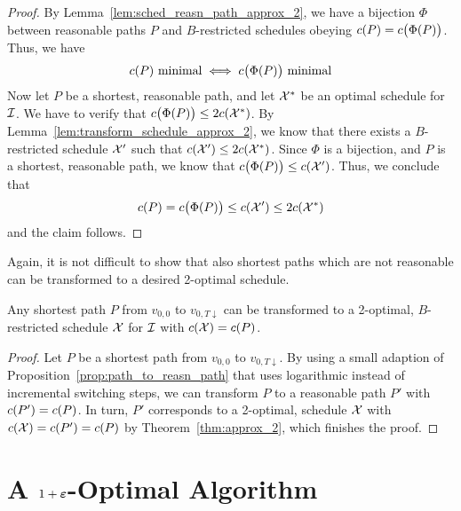 \begin{proof}
By Lemma~\ref{lem:sched_reasn_path_approx_2}, we have a bijection $\Phi$ between reasonable paths $P$ and $B$-restricted schedules obeying $c(P)=c\bigl(\Phi(P)\bigr)$. Thus, we have 
\begin{equation*}
	c(P)\text{ minimal}\iff c\bigl(\Phi(P)\big)\text{ minimal}
\end{equation*}
Now let $P$ be a shortest, reasonable path, and let $\mathcal{X}^*$ be an optimal schedule for $\mathcal{I}$. We have to verify that $c\bigl(\Phi(P)\bigr)\le 2c(\mathcal{X}^*)$. By Lemma~\ref{lem:transform_schedule_approx_2}, we know that there exists a $B$-restricted schedule $\mathcal{X}'$ such that $c(\mathcal{X}')\le 2c(\mathcal{X}^*)$. Since $\Phi$ is a bijection, and $P$ is a shortest, reasonable path, we know that $c\bigl(\Phi(P)\bigr)\le c(\mathcal{X}')$. Thus, we conclude that 
\begin{equation*}
	c(P)=c\bigl(\Phi(P)\bigr)\le c(\mathcal{X}')\le 2c(\mathcal{X}^*)
\end{equation*}
and the claim follows.
\end{proof}
Again, it is not difficult to show that also shortest paths which are not reasonable can be transformed to a desired 2-optimal schedule.
\begin{cor}\label{cor:opt_sched_short_path_pseudo_lin}
Any shortest path $P$ from $v_{0,0}$ to $v_{0,T\downarrow}$ can be transformed to a 2-optimal, $B$-restricted schedule $\mathcal{X}$ for $\mathcal{I}$ with $c(\mathcal{X})=c(P)$.
\end{cor}
\begin{proof}
Let $P$ be a shortest path from $v_{0,0}$ to $v_{0,T\downarrow}$. By using a small adaption of Proposition~\ref{prop:path_to_reasn_path} that uses logarithmic instead of incremental switching steps, we can transform $P$ to a reasonable path $P'$ with $c(P')=c(P)$.
In turn, $P'$ corresponds to a 2-optimal,  schedule $\mathcal{X}$ with $c(\mathcal{X})=c(P')=c(P)$ by Theorem~\ref{thm:approx_2}, which finishes the proof.
\end{proof}


\section{A $1+\boldsymbol\varepsilon$-Optimal Algorithm}
